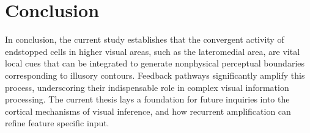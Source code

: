 \documentclass[12pt]{article}
\begin{document}
\section{Conclusion}
In conclusion, the current study establishes that the convergent activity of endstopped cells in higher visual areas, such as the lateromedial area, are vital  local cues that can be integrated to generate nonphysical perceptual boundaries corresponding to illusory contours. Feedback pathways significantly amplify this process, underscoring their indispensable role in complex visual information processing. The current thesis lays a foundation for future inquiries into the cortical mechanisms of visual inference, and how recurrent amplification can refine feature specific input. 




 
\end{document}

